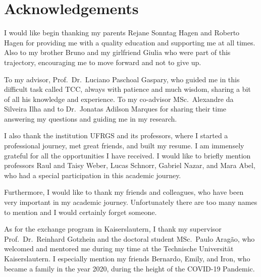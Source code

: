 
\chapter*{Acknowledgements}

I would like begin thanking my parents Rejane Sonntag Hagen and Roberto Hagen for providing me with a quality education and supporting me at all times. Also to my brother Bruno and my girlfriend Giulia who were part of this trajectory, encouraging me to move forward and not to give up.

To my advisor, Prof.~Dr.~Luciano Paschoal Gaspary, who guided me in this difficult task called TCC, always with patience and much wisdom, sharing a bit of all his knowledge and experience. To my co-advisor MSc.~Alexandre da Silveira Ilha and to Dr.~Jonatas Adilson Marques for sharing their time answering my questions and guiding me in my research.

I also thank the institution UFRGS and its professors, where I started a professional journey, met great friends, and built my resume. I am immensely grateful for all the opportunities I have received. I would like to briefly mention professors Raul and Taisy Weber, Lucas Schnorr, Gabriel Nazar, and Mara Abel, who had a special participation in this academic journey.

Furthermore, I would like to thank my friends and colleagues, who have been very important in my academic journey. Unfortunately there are too many names to mention and I would certainly forget someone.

As for the exchange program in Kaiserslautern, I thank my supervisor Prof.~Dr.~Reinhard Gotzhein and the doctoral student MSc.~Paulo Aragão, who welcomed and mentored me during my time at the Technische Universität Kaiserslautern. I especially mention my friends Bernardo, Emily, and Iron, who became a family in the year 2020, during the height of the COVID-19 Pandemic.

